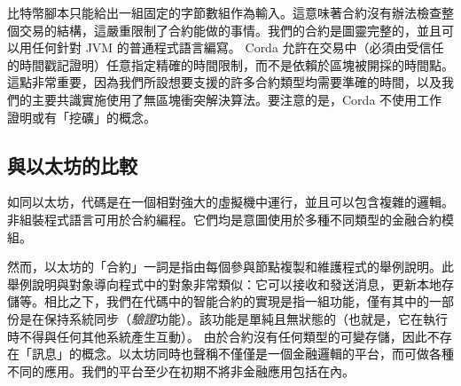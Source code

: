 \documentclass[UTF8]{ctexart}
\begin{document}
比特幣腳本只能給出一組固定的字節數組作為輸入。這意味著合約沒有辦法檢查整個交易的結構，這嚴重限制了合約能做的事情。我們的合約是圖靈完整的，並且可以用任何針對 JVM 的普通程式語言編寫。	
Corda 允許在交易中（必須由受信任的時間戳記證明）任意指定精確的時間限制，而不是依賴於區塊被開採的時間點。這點非常重要，因為我們所設想要支援的許多合約類型均需要準確的時間，以及我們的主要共識實施使用了無區塊衝突解決算法。要注意的是，Corda 不使用工作證明或有「挖礦」的概念。

\subsection{與以太坊的比較}
如同以太坊，代碼是在一個相對強大的虛擬機中運行，並且可以包含複雜的邏輯。非組裝程式語言可用於合約編程。它們均是意圖使用於多種不同類型的金融合約模組。

然而，以太坊的「合約」一詞是指由每個參與節點複製和維護程式的舉例說明。此舉例說明與對象導向程式中的對象非常類似：它可以接收和發送消息，更新本地存儲等。相比之下，我們在代碼中的智能合約的實現是指一組功能，僅有其中的一部份是在保持系統同步（\textit{驗證}功能）。該功能是單純且無狀態的（也就是，它在執行時不得與任何其他系統產生互動）。	由於合約沒有任何類型的可變存儲，因此不存在「訊息」的概念。以太坊同時也聲稱不僅僅是一個金融邏輯的平台，而可做各種不同的應用。我們的平台至少在初期不將非金融應用包括在內。



\end{document}
